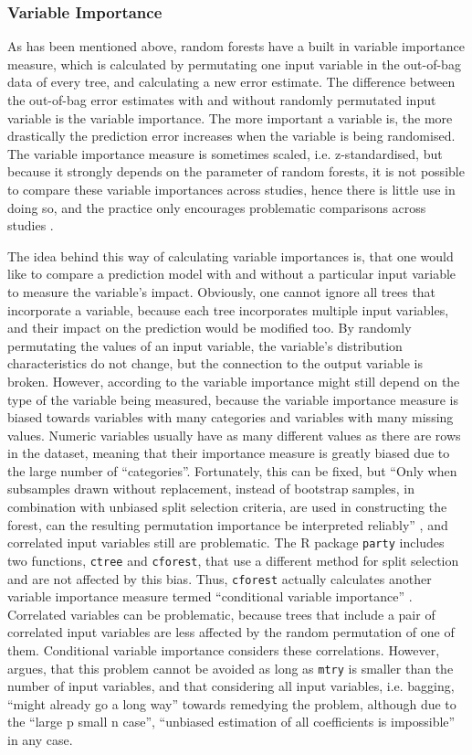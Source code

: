 \documentclass[a4paper,man,12pt,apacite,floatsintext]{apa6} %
\begin{document}
\subsubsection{Variable Importance}
As has been mentioned above, random forests have a built in variable
importance measure, which is calculated by permutating one input variable
in the out-of-bag data of every tree, and calculating a new error estimate.
The difference between the out-of-bag error estimates with and without
randomly permutated input variable is the variable importance.
The more important a variable is, the more drastically the prediction error
increases when the variable is being randomised.
The variable importance measure is sometimes scaled, i.e. z-standardised,
but because it strongly depends on the parameter of random forests,
it is not possible to compare these variable importances across studies,
hence there is little use in doing so, and the practice only encourages
problematic comparisons across studies \cite{strobl2009introduction}.

The idea behind this way of calculating variable importances is,
that one would like to compare a prediction model with and without a
particular input variable to measure the variable's impact.
Obviously, one cannot ignore all trees that incorporate a variable,
because each tree incorporates multiple input variables, and their impact
on the prediction would be modified too.
By randomly permutating the values of an input variable,
the variable's distribution characteristics do not change, but the connection to the
output variable is broken.
However, according to  the variable importance might
still depend on the type of the variable being measured, because the
variable importance measure is biased towards variables with many categories
and variables with many missing values.
Numeric variables usually have as many different values as there are rows
in the dataset, meaning that their importance measure is greatly biased due
to the large number of “categories”.
Fortunately, this can be fixed, but “Only when subsamples drawn without
replacement, instead of bootstrap samples, in combination with unbiased
split selection criteria, are used in constructing the forest, can the
resulting permutation importance be interpreted reliably”
\cite{strobl2007bias}, and correlated input variables still are
problematic.
The R package \texttt{party} includes two functions, \texttt{ctree} and
\texttt{cforest}, that use a different method for split selection and are not
affected by this bias.
Thus, \texttt{cforest} actually calculates another variable importance measure termed
“conditional variable importance” \cite{strobl2008conditional}.
Correlated variables can be problematic, because trees that include a
pair of correlated input variables are less affected by the random
permutation of one of them.
Conditional variable importance considers these correlations.
However,  argues, that this problem cannot be avoided
as long as \texttt{mtry} is smaller than the number of input variables,
and that considering all input variables, i.e. bagging,
“might already go a long way” towards remedying the problem,
although due to the “large p small n case”, “unbiased estimation of all
coefficients is impossible” in any case.
\end{document}
